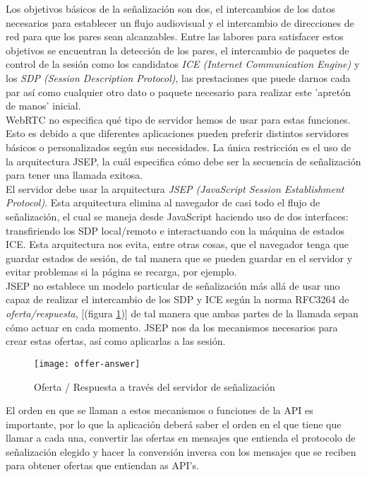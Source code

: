 Los objetivos básicos de la señalización son dos, el intercambios de los datos necesarios para establecer un flujo audiovisual y el intercambio de direcciones de red para que los pares sean alcanzables. Entre las labores para satisfacer estos objetivos se encuentran la detección de los pares, el intercambio de paquetes de control de la sesión como los candidatos \emph{ICE (Internet Communication Engine)} y los \emph{SDP (Session Description Protocol)}, las prestaciones que puede darnos cada par así como cualquier otro dato o paquete necesario para realizar este 'apretón de manos' inicial.\\

WebRTC no especifica qué tipo de servidor hemos de usar para estas funciones. Esto es debido a que diferentes aplicaciones pueden preferir distintos servidores básicos o personalizados según sus necesidades. La única restricción es el uso de la arquitectura JSEP, la cuál especifica cómo debe ser la secuencia de señalización para tener una llamada exitosa.\\


El servidor debe usar la arquitectura \emph{JSEP (JavaScript Session Establishment Protocol)}. Esta arquitectura elimina al navegador de casi todo el flujo de señalización, el cual se maneja desde JavaScript haciendo uso de dos interfaces: transfiriendo los SDP local/remoto e interactuando con la máquina de estados ICE. Esta arquitectura nos evita, entre otras cosas, que el navegador tenga que guardar estados de sesión, de tal manera que se pueden guardar en el servidor y evitar problemas si la página se recarga, por ejemplo. \\

JSEP no establece un modelo particular de señalización más allá de usar uno capaz de realizar el intercambio de los SDP y ICE según la norma RFC3264 de \emph{oferta/respuesta}, [(figura \ref{fig:oferta-respuesta})] de tal manera que ambas partes de la llamada sepan cómo actuar en cada momento. JSEP nos da los mecanismos necesarios para crear estas ofertas, así como aplicarlas a las sesión.\\

\begin{figure}[htb]
\centering
\texttt{[image: offer-answer]}
\caption{Oferta / Respuesta a través del servidor de señalización}
\label{fig:oferta-respuesta}
\end{figure}


El orden en que se llaman a estos mecanismos o funciones de la API es importante, por lo que la aplicación deberá saber el orden en el que tiene que llamar a cada una, convertir las ofertas en mensajes que entienda el protocolo de señalización elegido y hacer la conversión inversa con los mensajes que se reciben para obtener ofertas que entiendan as API's.\\


